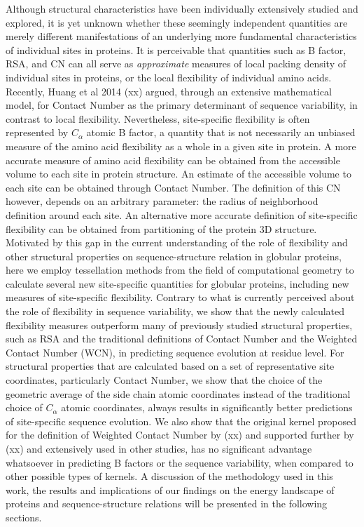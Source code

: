 \documentclass[11pt]{article}
\begin{document}
    Although structural characteristics have been individually extensively studied and explored, it is yet unknown whether these seemingly independent quantities are merely different manifestations of an underlying more fundamental characteristics of individual sites in proteins. It is perceivable that quantities such as B factor, RSA, and CN can all serve as {\it approximate} measures of local packing density of individual  sites in proteins, or the local flexibility of individual amino acids. Recently, Huang et al 2014 (xx) argued, through an extensive mathematical model, for Contact Number as the primary determinant of sequence variability, in contrast to local flexibility. Nevertheless, site-specific flexibility is often represented by $C_\alpha$ atomic B factor, a quantity that is not necessarily an unbiased measure of the amino acid flexibility as a whole in a given site in protein. A more accurate measure of amino acid flexibility can be obtained from the accessible volume to each site in protein structure. An estimate of the accessible volume to each site can be obtained through Contact Number. The definition of this CN however, depends on an arbitrary parameter: the radius of neighborhood definition around each site.  An alternative more accurate definition of site-specific flexibility can be obtained from partitioning of the protein 3D structure. \\

    Motivated by this gap in the current understanding of the role of flexibility and other structural properties on sequence-structure relation in globular proteins, here we employ tessellation methods from the field of computational geometry to calculate several new site-specific quantities for globular proteins, including new measures of site-specific flexibility. Contrary to what is currently perceived about the role of flexibility in sequence variability, we show that the newly calculated flexibility measures outperform many of previously studied structural properties, such as RSA and the traditional definitions of Contact Number and the Weighted Contact Number (WCN), in predicting sequence evolution at residue level.  For structural properties that are calculated based on a set of representative site coordinates, particularly Contact Number, we show that the choice of the geometric average of the side chain atomic coordinates instead of the traditional choice of $C_\alpha$ atomic coordinates, always results in significantly better predictions of site-specific sequence evolution. We also show that the original kernel proposed for the definition of Weighted Contact Number by (xx) and supported further by (xx) and extensively used in other studies, has no significant advantage whatsoever in predicting B factors or the sequence variability, when compared to other possible types of kernels. A discussion of the methodology used in this work, the results and implications of our findings on the energy landscape of proteins and sequence-structure relations will be presented in the following sections.  \\
\end{document}
